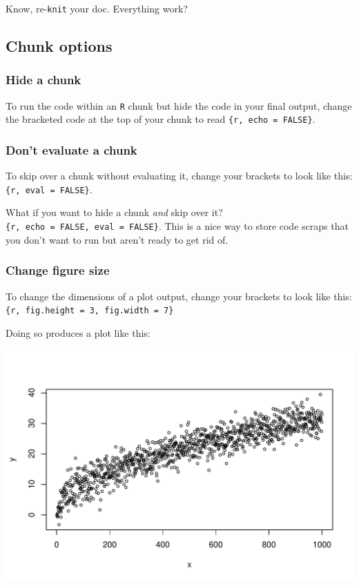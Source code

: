 \documentclass[
]{book}
\begin{document}
Know, re-\texttt{knit} your doc. Everything work?

\hypertarget{chunk-options}{%
\subsection*{Chunk options}\label{chunk-options}}

\hypertarget{hide-a-chunk}{%
\subsubsection*{Hide a chunk}\label{hide-a-chunk}}

To run the code within an \texttt{R} chunk but hide the code in your final output, change the bracketed code at the top of your chunk to read \texttt{\{r,\ echo\ =\ FALSE\}}.

\hypertarget{dont-evaluate-a-chunk}{%
\subsubsection*{Don't evaluate a chunk}\label{dont-evaluate-a-chunk}}

To skip over a chunk without evaluating it, change your brackets to look like this: \texttt{\{r,\ eval\ =\ FALSE\}}.

What if you want to hide a chunk \emph{and} skip over it? \texttt{\{r,\ echo\ =\ FALSE,\ eval\ =\ FALSE\}}. This is a nice way to store code scraps that you don't want to run but aren't ready to get rid of.

\hypertarget{change-figure-size}{%
\subsubsection*{Change figure size}\label{change-figure-size}}

To change the dimensions of a plot output, change your brackets to look like this:
\texttt{\{r,\ fig.height\ =\ 3,\ fig.width\ =\ 7\}}

Doing so produces a plot like this:

\includegraphics[width=504px]{figures/unnamed-chunk-214-1}
\end{document}
